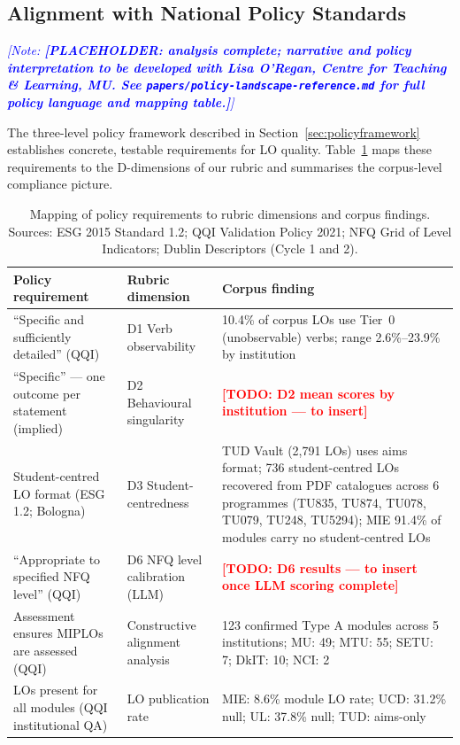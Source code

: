 \documentclass[12pt, a4paper]{article}
\newcommand{\todo}[1]{\textcolor{red}{\textbf{[TODO: #1]}}}
\newcommand{\note}[1]{\textcolor{blue}{\textit{[Note: #1]}}}
\begin{document}
\subsection{Alignment with National Policy Standards}
\label{sec:policyalignment}

\note{\textbf{[PLACEHOLDER: analysis complete; narrative and policy interpretation
to be developed with Lisa O'Regan, Centre for Teaching \& Learning, MU. See
\texttt{papers/policy-landscape-reference.md} for full policy language and
mapping table.]}}

The three-level policy framework described in Section~\ref{sec:policyframework}
establishes concrete, testable requirements for LO quality. Table~\ref{tab:policy-mapping}
maps these requirements to the D-dimensions of our rubric and summarises the
corpus-level compliance picture.

\begin{table}[H]
\centering
\caption{Mapping of policy requirements to rubric dimensions and corpus findings.
Sources: ESG 2015 Standard 1.2; QQI Validation Policy 2021; NFQ Grid of Level
Indicators; Dublin Descriptors (Cycle 1 and 2).}
\label{tab:policy-mapping}
\begin{tabularx}{\textwidth}{p{}p{}X}
\toprule
\textbf{Policy requirement} & \textbf{Rubric dimension} & \textbf{Corpus finding} \\
\midrule
\enquote{Specific and sufficiently detailed} (QQI) &
  D1 Verb observability &
  10.4\% of corpus LOs use Tier~0 (unobservable) verbs; range 2.6\%--23.9\% by institution \\
\addlinespace
\enquote{Specific} — one outcome per statement (implied) &
  D2 Behavioural singularity &
  \todo{D2 mean scores by institution — to insert} \\
\addlinespace
Student-centred LO format (ESG 1.2; Bologna) &
  D3 Student-centredness &
  TUD Vault (2,791 LOs) uses aims format; 736 student-centred LOs recovered from PDF catalogues across 6 programmes (TU835, TU874, TU078, TU079, TU248, TU5294); MIE 91.4\% of modules carry no student-centred LOs \\
\addlinespace
\enquote{Appropriate to specified NFQ level} (QQI) &
  D6 NFQ level calibration (LLM) &
  \todo{D6 results — to insert once LLM scoring complete} \\
\addlinespace
Assessment ensures MIPLOs are assessed (QQI) &
  Constructive alignment analysis &
  123 confirmed Type A modules across 5 institutions; MU: 49; MTU: 55; SETU: 7; DkIT: 10; NCI: 2 \\
\addlinespace
LOs present for all modules (QQI institutional QA) &
  LO publication rate &
  MIE: 8.6\% module LO rate; UCD: 31.2\% null; UL: 37.8\% null; TUD: aims-only \\
\bottomrule
\end{tabularx}
\end{table}
\end{document}
